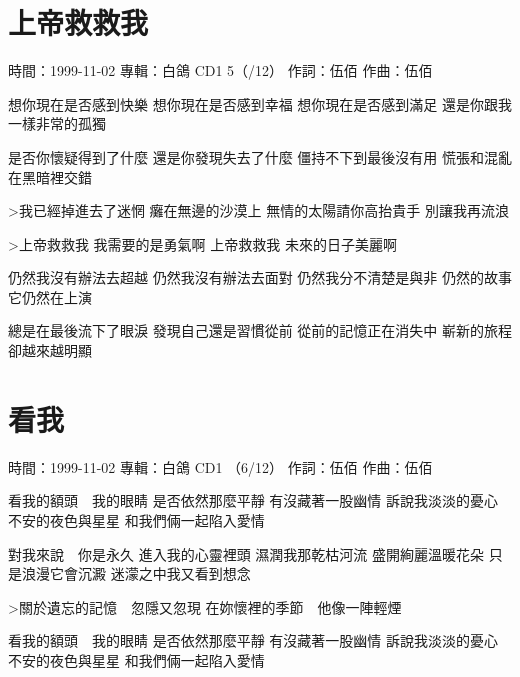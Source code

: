 \documentclass[UTF8,a4paper,oneside,twocolumn,12pt]{ctexbook}
\newcommand{\infopair}[2]{\textbullet #1：#2}
\newcommand{\zc}[1][伍佰]{\infopair{作詞}{#1}}
\newcommand{\zq}[1][伍佰]{\infopair{作曲}{#1}}
\newcommand{\zj}[1]{\infopair{專輯}{#1}}
\newcommand{\sj}[1]{\infopair{時間}{#1}}
\newenvironment{info}{\begin{flushleft}\kaishu
	}
	{\end{flushleft}\normalsize\yahei\par}
\newenvironment{lyric}{
	}
{}
\begin{document}
\section{上帝救救我}
\begin{info}
	\sj{1999-11-02}
	\zj{白鴿 CD1 5（/12）}
	\zc
	\zq
\end{info}
\begin{lyric}
	想你現在是否感到快樂
	想你現在是否感到幸福
	想你現在是否感到滿足
	還是你跟我一樣非常的孤獨

	是否你懷疑得到了什麼
	還是你發現失去了什麼
	僵持不下到最後沒有用
	慌張和混亂在黑暗裡交錯

	>我已經掉進去了迷惘
	癱在無邊的沙漠上
	無情的太陽請你高抬貴手
	別讓我再流浪

	>上帝救救我
	我需要的是勇氣啊
	上帝救救我
	未來的日子美麗啊

	仍然我沒有辦法去超越
	仍然我沒有辦法去面對
	仍然我分不清楚是與非
	仍然的故事它仍然在上演

	總是在最後流下了眼淚
	發現自己還是習慣從前
	從前的記憶正在消失中
	嶄新的旅程卻越來越明顯
\end{lyric}

\section{看我}
\begin{info}
	\sj{1999-11-02}
	\zj{白鴿 CD1 （6/12）}
	\zc
	\zq
\end{info}
\begin{lyric}
	看我的額頭　我的眼睛
	是否依然那麼平靜
	有沒藏著一股幽情
	訴說我淡淡的憂心
	不安的夜色與星星
	和我們倆一起陷入愛情

	對我來說　你是永久
	進入我的心靈裡頭
	濕潤我那乾枯河流
	盛開絢麗溫暖花朵
	只是浪漫它會沉澱
	迷濛之中我又看到想念

	>關於遺忘的記憶　忽隱又忽現
	在妳懷裡的季節　他像一陣輕煙

	看我的額頭　我的眼睛
	是否依然那麼平靜
	有沒藏著一股幽情
	訴說我淡淡的憂心
	不安的夜色與星星
	和我們倆一起陷入愛情
\end{lyric}
\end{document}
